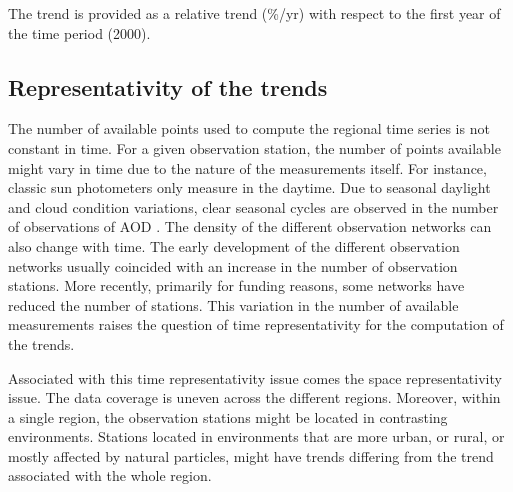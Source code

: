 \documentclass[journal abbreviation, manuscript]{copernicus}
\begin{document}
The trend is provided as a relative trend (\%/yr) with respect to the first year of the time period (2000).

\subsection{Representativity of the trends}
The number of available points used to compute the regional time series is not constant in time. For a given observation station, the number of points available might vary in time due to the nature of the measurements itself. For instance, classic sun photometers only measure in the daytime. Due to seasonal daylight and cloud condition variations, clear seasonal cycles are observed in the number of observations of AOD . The density of the different observation networks can also change with time. The early development of the different observation networks usually coincided with an increase in the number of observation stations. More recently, primarily for funding reasons, some networks have reduced the number of stations. This variation in the number of available measurements raises the question of time representativity for the computation of the trends.

Associated with this time representativity issue comes the space representativity issue. The data coverage is uneven across the different regions. Moreover, within a single region, the observation stations might be located in contrasting environments. Stations located in environments that are more urban, or rural, or mostly affected by natural particles, might have trends differing from the trend associated with the whole region.
\end{document}
